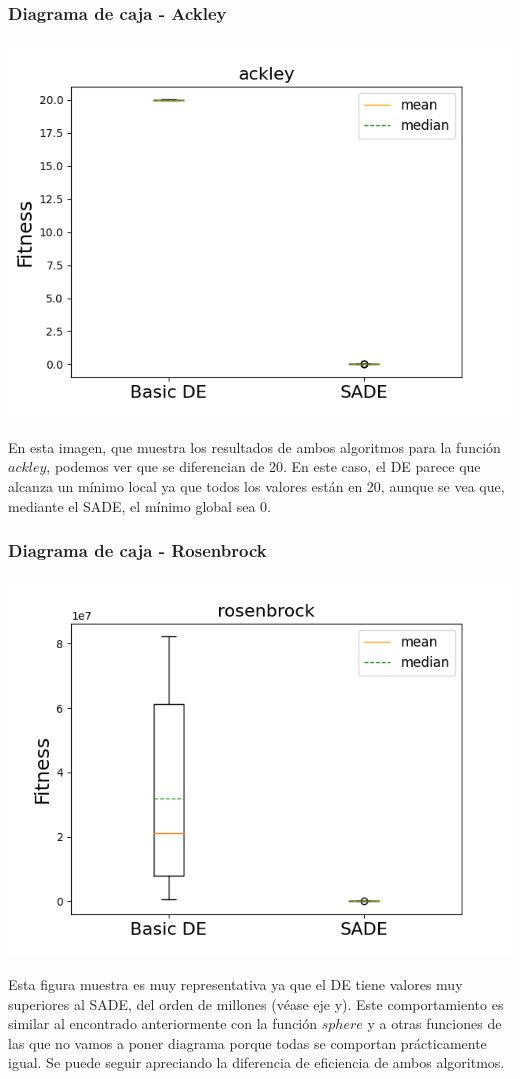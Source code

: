 \documentclass[11pt, a4paper, titlepage]{article}
\begin{document}
\subsubsection{Diagrama de caja - Ackley}
\begin{center}
\includegraphics[scale=0.85]{ackley}
\end{center}
En esta imagen, que muestra los resultados de ambos algoritmos para la función $ackley$, podemos ver que se diferencian de 20. En este caso, el DE parece que alcanza un mínimo local ya que todos los valores están en 20, aunque se vea que, mediante el SADE, el mínimo global sea 0.
\subsubsection{Diagrama de caja - Rosenbrock}
\begin{center}
\includegraphics[scale=0.85]{rosenbrock}
\end{center}
Esta figura muestra es muy representativa ya que el DE tiene valores muy superiores al SADE, del orden de millones (véase eje y). Este comportamiento es similar al encontrado anteriormente con la función $sphere$ y a otras funciones de las que no vamos a poner diagrama porque todas se comportan prácticamente igual. Se puede seguir apreciando la diferencia de eficiencia de ambos algoritmos.
\end{document}
